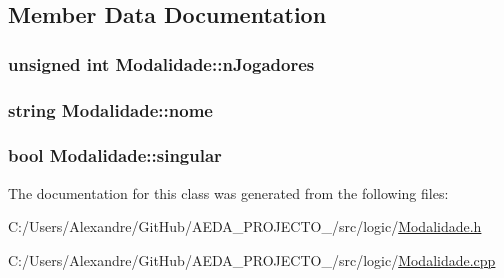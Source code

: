 \subsection{Member Data Documentation}
\hypertarget{class_modalidade_a2ad080095c3fc56d05cbca69048a2704}{}
\subsubsection[{n\+Jogadores}]{\setlength{\rightskip}{0pt plus 5cm}unsigned int Modalidade\+::n\+Jogadores\hspace{0.3cm}{\ttfamily [private]}}\label{class_modalidade_a2ad080095c3fc56d05cbca69048a2704}
\hypertarget{class_modalidade_aaff7ae66117d1ee2bc9754bc45713c7e}{}
\subsubsection[{nome}]{\setlength{\rightskip}{0pt plus 5cm}string Modalidade\+::nome\hspace{0.3cm}{\ttfamily [private]}}\label{class_modalidade_aaff7ae66117d1ee2bc9754bc45713c7e}
\hypertarget{class_modalidade_aaaea707c4eb8b1c6271d8ecafe09799f}{}
\subsubsection[{singular}]{\setlength{\rightskip}{0pt plus 5cm}bool Modalidade\+::singular\hspace{0.3cm}{\ttfamily [private]}}\label{class_modalidade_aaaea707c4eb8b1c6271d8ecafe09799f}


The documentation for this class was generated from the following files\+:\begin{DoxyCompactItemize}
\item 
C\+:/\+Users/\+Alexandre/\+Git\+Hub/\+A\+E\+D\+A\+\_\+\+P\+R\+O\+J\+E\+C\+T\+O\+\_/src/logic/\hyperlink{_modalidade_8h}{Modalidade.\+h}\item 
C\+:/\+Users/\+Alexandre/\+Git\+Hub/\+A\+E\+D\+A\+\_\+\+P\+R\+O\+J\+E\+C\+T\+O\+\_/src/logic/\hyperlink{_modalidade_8cpp}{Modalidade.\+cpp}\end{DoxyCompactItemize}
